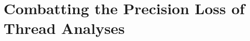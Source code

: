 

\chapter{Combatting the Precision Loss of Thread Analyses}\label{chapter:precisionLossThreadAnalyses}
  
